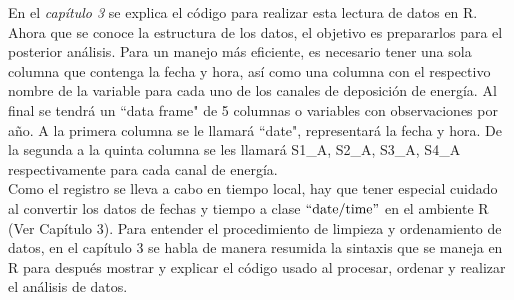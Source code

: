 En el \emph{capítulo 3} se explica el código para realizar esta lectura de datos en R.\\
 
 
Ahora que se conoce la estructura de los datos, el objetivo es prepararlos para el posterior análisis. Para un manejo más eficiente, es necesario tener una sola columna que contenga la fecha y hora, así como una columna con el respectivo nombre de la variable para cada uno de los canales de deposición de energía. Al final se tendrá un ``data frame" de 5 columnas o variables con observaciones por año. A la primera columna se le llamará ``date", representará la fecha y hora. De la segunda a la quinta columna se les llamará S1\_A, S2\_A, S3\_A, S4\_A respectivamente para cada canal de energía.\\

Como el registro se lleva a cabo en tiempo local, hay que tener especial cuidado al convertir los datos de fechas y tiempo a clase $\mathrm{``date/time"}$  en el ambiente R (Ver Capítulo 3). Para entender el procedimiento de limpieza y ordenamiento de datos, en el capítulo 3 se habla de manera resumida la sintaxis que se maneja en R para después mostrar y explicar el código usado al procesar, ordenar y realizar el análisis de datos.

